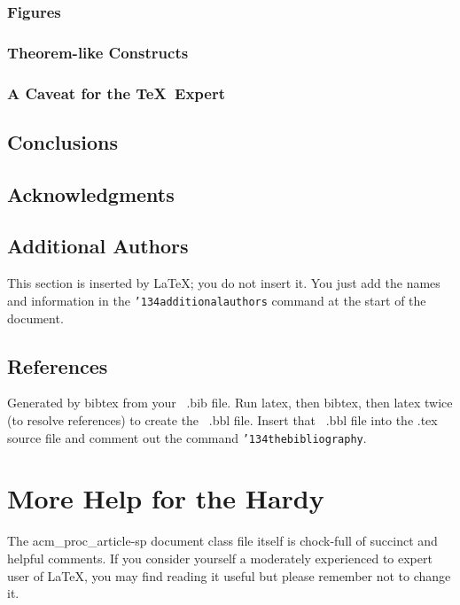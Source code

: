 \documentclass{acm_proc_article-sp}
\begin{document}
\subsubsection{Figures}
\subsubsection{Theorem-like Constructs}
\subsubsection*{A Caveat for the \TeX\ Expert}
\subsection{Conclusions}
\subsection{Acknowledgments}
\subsection{Additional Authors}
This section is inserted by \LaTeX; you do not insert it.
You just add the names and information in the
\texttt{{\char'134}additionalauthors} command at the start
of the document.

\subsection{References}
Generated by bibtex from your ~.bib file.  Run latex,
then bibtex, then latex twice (to resolve references)
to create the ~.bbl file.  Insert that ~.bbl file into
the .tex source file and comment out
the command \texttt{{\char'134}thebibliography}.

\section{More Help for the Hardy}
The acm\_proc\_article-sp document class file itself is chock-full of succinct
and helpful comments.  If you consider yourself a moderately
experienced to expert user of \LaTeX, you may find reading
it useful but please remember not to change it.
\balancecolumns
\end{document}
